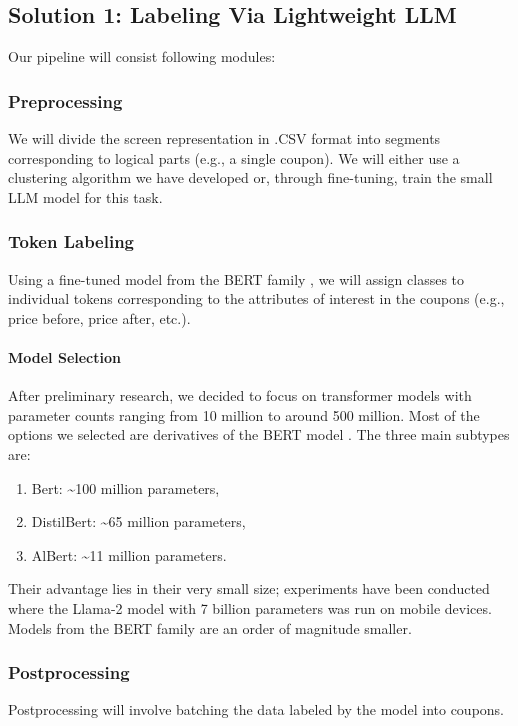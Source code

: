 \documentclass[12pt]{article}
\begin{document}
\subsection*{Solution 1: Labeling Via Lightweight LLM}
Our pipeline will consist following modules:

\subsubsection*{Preprocessing}
We will divide the screen representation in .CSV format into segments corresponding to logical parts (e.g., a single coupon). We will either use a clustering algorithm we have developed or, through fine-tuning, train the small LLM model for this task.

\subsubsection*{Token Labeling}
Using a fine-tuned model from the BERT family \cite{devlin2019bertpretrainingdeepbidirectional}, we will assign classes to individual tokens corresponding to the attributes of interest in the coupons (e.g., price before, price after, etc.).

\paragraph{Model Selection}
After preliminary research, we decided to focus on transformer models with parameter counts ranging from 10 million to around 500 million. Most of the options we selected are derivatives of the BERT model \cite{devlin2019bertpretrainingdeepbidirectional}. The three main subtypes are:
\begin{enumerate}
    \item Bert: \textasciitilde100 million parameters,
    \item DistilBert: \textasciitilde65 million parameters,
    \item AlBert: \textasciitilde11 million parameters.
\end{enumerate}
Their advantage lies in their very small size; experiments \cite{LLMmobile2024} have been conducted where the Llama-2 model with 7 billion parameters was run on mobile devices. Models from the BERT family are an order of magnitude smaller.

\subsubsection*{Postprocessing}
Postprocessing will involve batching the data labeled by the model into coupons.
\end{document}

